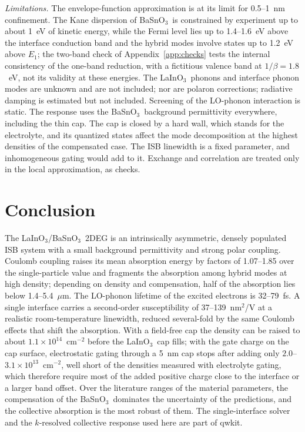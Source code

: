 \documentclass[11pt]{article}
\newcommand{\LIO}{\texorpdfstring{LaInO$_3$}{LaInO3}}
\newcommand{\BSO}{\texorpdfstring{BaSnO$_3$}{BaSnO3}}
\begin{document}
\emph{Limitations.} The envelope-function approximation is at its limit for 0.5--1~nm confinement. The Kane dispersion of \BSO\ is constrained by experiment up to about 1~eV of kinetic energy, while the Fermi level lies up to 1.4--1.6~eV above the interface conduction band and the hybrid modes involve states up to 1.2~eV above $E_1$; the two-band check of Appendix~\ref{app:checks} tests the internal consistency of the one-band reduction, with a fictitious valence band at $1/\beta=1.8$~eV, not its validity at these energies. The \LIO\ phonons and interface phonon modes are unknown and are not included; nor are polaron corrections; radiative damping is estimated but not included. Screening of the LO-phonon interaction is static. The response uses the \BSO\ background permittivity everywhere, including the thin cap. The cap is closed by a hard wall, which stands for the electrolyte, and its quantized states affect the mode decomposition at the highest densities of the compensated case. The ISB linewidth is a fixed parameter, and inhomogeneous gating would add to it. Exchange and correlation are treated only in the local approximation, as checks.

\section{Conclusion}
The \LIO/\BSO\ 2DEG is an intrinsically asymmetric, densely populated ISB system with a small background permittivity and strong polar coupling. Coulomb coupling raises its mean absorption energy by factors of 1.07--1.85 over the single-particle value and fragments the absorption among hybrid modes at high density; depending on density and compensation, half of the absorption lies below 1.4--5.4~$\mu$m. The LO-phonon lifetime of the excited electrons is 32--79~fs. A single interface carries a second-order susceptibility of 37--139~nm$^2$/V at a realistic room-temperature linewidth, reduced several-fold by the same Coulomb effects that shift the absorption. With a field-free cap the density can be raised to about $1.1\times10^{14}$~cm$^{-2}$ before the \LIO\ cap fills; with the gate charge on the cap surface, electrostatic gating through a 5~nm cap stops after adding only $2.0$--$3.1\times10^{13}$~cm$^{-2}$, well short of the densities measured with electrolyte gating, which therefore require most of the added positive charge close to the interface or a larger band offset. Over the literature ranges of the material parameters, the compensation of the \BSO\ dominates the uncertainty of the predictions, and the collective absorption is the most robust of them. The single-interface solver and the $k$-resolved collective response used here are part of qwkit.
\end{document}
